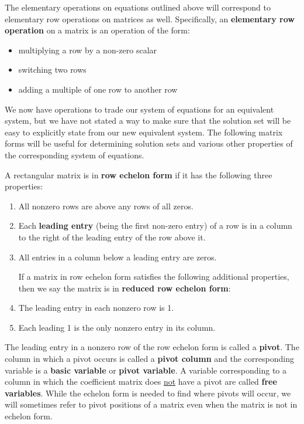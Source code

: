 The elementary operations on equations outlined above will correspond to elementary row operations on matrices as well. Specifically,
an \textbf{elementary row operation} on a matrix is an operation of the form:
\begin{itemize}
\item multiplying a row by a non-zero scalar
\item switching two rows
\item adding a multiple of one row to another row
\end{itemize}
We now have operations to trade our system of equations for an equivalent system, but we have not stated a way to make sure that the solution set will be easy to explicitly state from our new equivalent system. The following matrix forms will be useful for determining solution sets and various other properties of the corresponding system of equations.

\begin{definition}
A rectangular matrix is in \textbf{row echelon form} if it has the following three properties:
\begin{enumerate}
\item All nonzero rows are above any rows of all zeros.
\item Each \textbf{leading entry} (being the first non-zero entry) of a row is in a column to the right of the leading entry of the row above it.
\item All entries in a column below a leading entry are zeros.

If a matrix in row echelon form satisfies the following additional properties, then we say the matrix is in \textbf{reduced row echelon form}:

\item The leading entry in each nonzero row is 1.
\item Each leading 1 is the only nonzero entry in its column.
\end{enumerate}
\end{definition}

The leading entry in a nonzero row of the row echelon form is called a \textbf{pivot}. The column in which a pivot occurs is called a \textbf{pivot column} and the corresponding variable is a \textbf{basic variable} or \textbf{pivot variable}. A variable corresponding to a column in which the coefficient matrix does \underline{not} have a pivot are called \textbf{free variables}. While the echelon form is needed to find where pivots will occur, we will sometimes refer to pivot positions of a matrix even when the matrix is not in echelon form.

